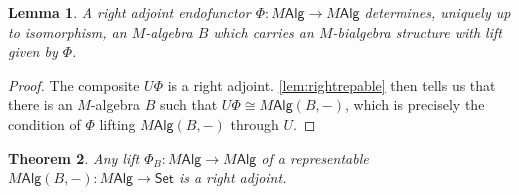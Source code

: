 \documentclass[12pt,reqno]{amsart}
\theoremstyle{plain}
\newtheorem{thm}{Theorem}
\newtheorem{lem}[thm]{Lemma}
\theoremstyle{definition}
\theoremstyle{remark}
\newcommand{\maps}{\colon}
\newcommand{\namedcat}[1]{\mathsf{#1}}
\newcommand{\Alg}{\namedcat{Alg}}
\newcommand{\Set}{\namedcat{Set}}
\numberwithin{thm}{section}
\begin{document}
\begin{lem} 
\label{cor:repr}
    A right adjoint endofunctor $\Phi \maps M\Alg \to M\Alg$ determines, uniquely up to isomorphism, an $M$-algebra $B$ which carries an $M$-bialgebra structure with lift given by $\Phi$. 
\end{lem}

\begin{proof}
    The composite $U\Phi$ is a right adjoint. \cref{lem:rightrepable} then tells us that there is an $M$-algebra $B$ such that $U\Phi \cong M\Alg(B,-)$, which is precisely the condition of $\Phi$ lifting $M\Alg(B,-)$ through $U$.
\end{proof}

\begin{thm}
\label{thm:liftadjoint}
    Any lift $\Phi_B \maps M\Alg \to M\Alg$ of a representable $M\Alg(B, -) \maps M\Alg \to \Set$ is a right adjoint. 
\end{thm}
\end{document}
